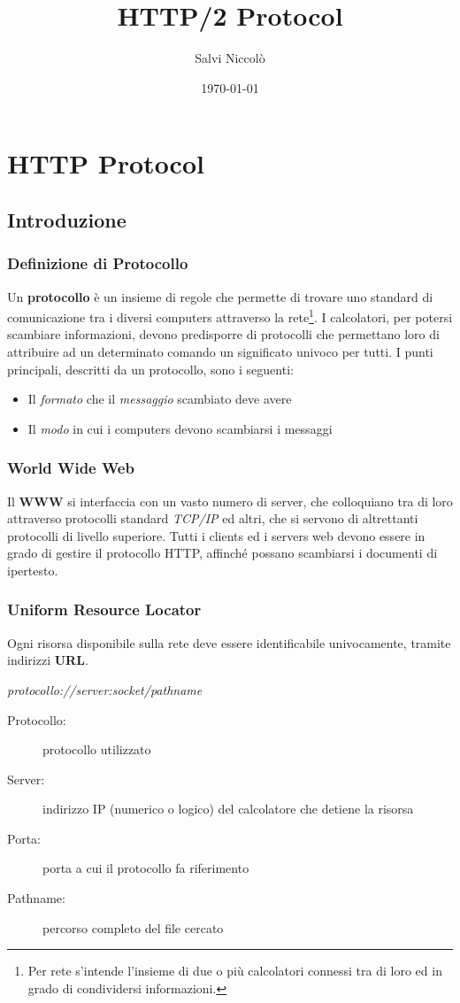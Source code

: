 \documentclass[a4paper,11pt]{article}
\title{HTTP/2 Protocol}
\author{Salvi Niccolò}
\date{\today}
\begin{document}
\setlength{\parindent}{4em}
\maketitle
\tableofcontents
\pagebreak
\section{HTTP Protocol}
\subsection{Introduzione}
\subsubsection{Definizione di Protocollo}
Un \textbf{protocollo} è un insieme di regole che permette di trovare uno standard di comunicazione tra i diversi computers attraverso la rete\footnote{Per rete s’intende l'insieme di due o più calcolatori connessi tra di loro ed in grado di condividersi informazioni.}.\newline
I calcolatori, per potersi scambiare informazioni, devono predisporre di protocolli che permettano loro di attribuire ad un determinato comando un significato univoco per tutti.\bigbreak
\noindent I punti principali, descritti da un protocollo, sono i seguenti:
\begin{itemize}
    \item Il \textit{formato} che il \textit{messaggio} scambiato deve avere
    \item Il \textit{modo} in cui i computers devono scambiarsi i messaggi
\end{itemize}
\subsubsection{World Wide Web}
Il \textbf{WWW} si interfaccia con un vasto numero di server, che colloquiano tra di loro attraverso protocolli standard \textit{TCP/IP} ed altri, che si servono di altrettanti protocolli di livello superiore.\newline
Tutti i clients ed i servers web devono essere in grado di gestire il protocollo HTTP, affinché possano scambiarsi i documenti di ipertesto.
\subsubsection{Uniform Resource Locator}
Ogni risorsa disponibile sulla rete deve essere identificabile univocamente, tramite indirizzi \textbf{URL}.\bigbreak
\centerline{\emph{protocollo://server:socket/pathname}}
\begin{description}
    \item[Protocollo:] protocollo utilizzato
    \item[Server:] indirizzo IP (numerico o logico) del calcolatore che detiene la risorsa
    \item[Porta:] porta a cui il protocollo fa riferimento
    \item[Pathname:] percorso completo del file cercato
\end{description}
\end{document}
